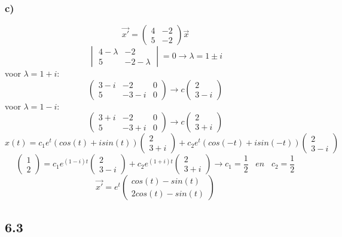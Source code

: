 \documentclass[11pt]{article}
\begin{document}
\subsubsection*{c)}
\[
\vec{x'} = \begin{pmatrix}
4 & -2\\
5 & -2
\end{pmatrix}\vec{x}
\]
\[
\begin{vmatrix}
4-\lambda & -2\\
5 & -2-\lambda
\end{vmatrix}
=0
\longrightarrow
\lambda = 1 \pm i
\]
voor $\lambda=1+i$:
\[
\left(
\begin{array}{cc|c}
3-i & -2 & 0 \\
5 & -3-i & 0
\end{array}
\right)
\longrightarrow
c
\begin{pmatrix}
2 \\ 3-i
\end{pmatrix}
\]
voor $\lambda=1-i$:
\[
\left(
\begin{array}{cc|c}
3+i & -2 & 0 \\
5 & -3+i & 0
\end{array}
\right)
\longrightarrow
c
\begin{pmatrix}
2 \\ 3+i
\end{pmatrix}
\]
\[
x(t)=
c_1e^t(cos(t)+isin(t))
\begin{pmatrix}
2 \\ 3+i
\end{pmatrix}
+
c_2e^t(cos(-t)+isin(-t))
\begin{pmatrix}
2 \\ 3-i
\end{pmatrix}
\]
\[
\begin{pmatrix}
1\\2
\end{pmatrix}
=
c_1
e^{(1-i)t}
\begin{pmatrix}
2\\3-i
\end{pmatrix}
+
c_2
e^{(1+i)t}
\begin{pmatrix}
2\\3+i
\end{pmatrix}
\longrightarrow
c_1 = \frac{1}{2}
\;\;\;en\;\;\;
c_2 = \frac{1}{2}
\]
\[
\vec{x'} = e^t\begin{pmatrix}
cos(t)-sin(t)\\2cos(t)-sin(t)
\end{pmatrix}
\]


\subsection*{6.3}
\end{document}

